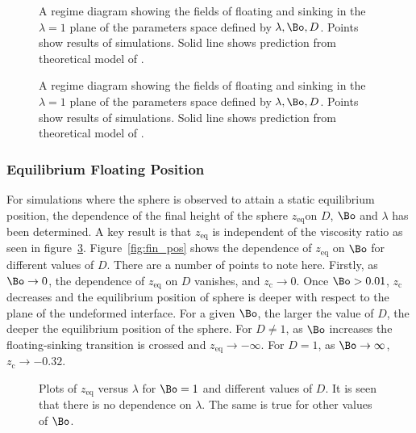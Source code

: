 {  \begin{figure}
    \resizebox{0.9\textwidth}{!}{\large }
    \caption{A regime diagram showing the fields of floating and sinking in the $\lambda = 1$ plane of the parameters space defined by ${\lambda, \Bo, D}$. Points show results of simulations. Solid line shows prediction from theoretical model of \citep{Vella06}.\label{fig:regime}}
  \end{figure}

  \begin{figure}
    \resizebox{0.9\textwidth}{!}{\large }
    \caption{A regime diagram showing the fields of floating and sinking in the $\lambda = 1$ plane of the parameters space defined by ${\lambda, \Bo, D}$. Points show results of simulations. Solid line shows prediction from theoretical model of \citep{Vella06}.\label{fig:zoom_regime}}
  \end{figure}

\subsubsection{Equilibrium Floating Position}
\label{subsubsec:equilib_pos}

For simulations where the sphere is observed to attain a static equilibrium position, the dependence of the final height of the sphere $z_{\text{eq}}$on $D$, $\Bo$ and $\lambda$ has been determined. A key result is that $z_{\text{eq}}$ is independent of the viscosity ratio as seen in figure~\ref{fig:fin_pos_viscos}. Figure~\ref{fig:fin_pos} shows the dependence of $z_{\text{eq}}$ on $\Bo$ for different values of $D$. There are a number of points to note here. Firstly, as $\Bo \to 0$, the dependence of $z_{\text{eq}}$ on $D$ vanishes, and $z_{\text{c}} \to 0$. Once $\Bo > 0.01$, $z_{\text{c}}$ decreases and the equilibrium position of sphere is deeper with respect to the plane of the undeformed interface. For a given $\Bo$, the larger the value of $D$, the deeper the equilibrium position of the sphere. For $D \neq 1$, as $\Bo$ increases the floating-sinking transition is crossed and $z_{\text{eq}} \to -\infty$. For $D = 1$, as $\Bo \to \infty$, $z_{\text{c}} \to -0.32$. 

  \begin{figure}
    \resizebox{0.9\textwidth}{!}{\large }
    \caption{Plots of $z_{\text{eq}}$ versus $\lambda$ for $\Bo = 1$ and different values of $D$. It is seen that there is no dependence on $\lambda$. The same is true for other values of $\Bo$. \label{fig:fin_pos_viscos}}
  \end{figure}

}
